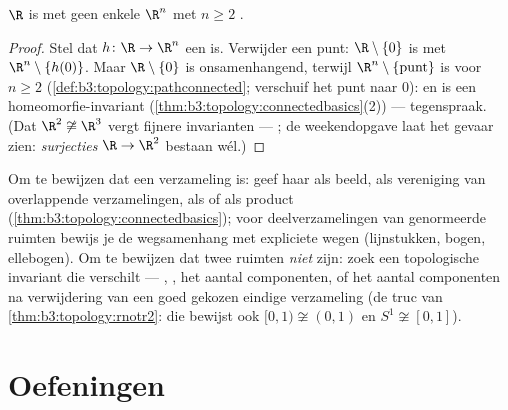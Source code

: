\begin{theorem}\label{thm:b3:topology:rnotr2}
$\R$ is met geen enkele $\R^n$ met $n \geq 2$ .
\end{theorem}

\begin{proof}
Stel dat $h \colon \R \to \R^n$ een  is. Verwijder
een punt: $\R \setminus \{0\}$ is  met $\R^n \setminus
\{h(0)\}$. Maar $\R\setminus\{0\}$ is onsamenhangend, terwijl
$\R^n\setminus\{\text{punt}\}$  is voor $n \geq 2$
(\cref{def:b3:topology:pathconnected}; verschuif het punt naar
$0$): en  is een homeomorfie-invariant
(\cref{thm:b3:topology:connectedbasics}(2)) --- tegenspraak. (Dat
$\R^2 \not\cong \R^3$ vergt fijnere invarianten --- 
; de weekendopgave laat het gevaar zien: \emph{
surjecties} $\R \to \R^2$ bestaan wél.)
\end{proof}

\begin{method}\label{met:b3:topology:connectargument}
Om te bewijzen dat een verzameling  is: geef haar als
 beeld, als vereniging van overlappende 
verzamelingen, als  of als product
(\cref{thm:b3:topology:connectedbasics}); voor deelverzamelingen
van genormeerde ruimten bewijs je de wegsamenhang met expliciete
wegen (lijnstukken, bogen, ellebogen). Om te bewijzen dat twee
ruimten \emph{niet}  zijn: zoek een topologische
invariant die verschilt --- , , het aantal
componenten, of het aantal componenten na verwijdering van een
goed gekozen eindige verzameling (de truc van
\cref{thm:b3:topology:rnotr2}: die bewijst ook $[0,1) \not\cong
(0,1)$ en $S^1 \not\cong [0,1]$).
\end{method}

\section{Oefeningen}

